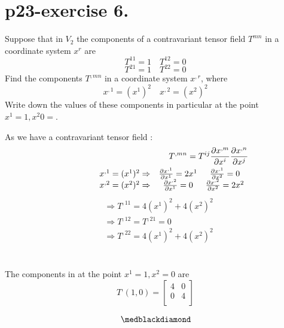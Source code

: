 \section{p23-exercise 6.}
\begin{tcolorbox}
Suppose that in $V_2$ the components of a contravariant tensor field $T^{mn}$ in a coordinate system $x^r$ are 
$$T^{11}=1 \quad T^{12}=0$$
$$T^{21}=1 \quad T^{22}=0$$
Find the components $T^{,mn}$ in a coordinate system $x^{,r}$, where
$$x^{,1} =(x^{1})^2\quad x^{,2} = (x^{2})^2$$
Write down the values of these components in particular at the point $x^1 = 1, x^2 0 =$.
\end{tcolorbox}
As we have a contravariant tensor field :
\begin{align}
\ T^{,mn} =  T^{ij}\pdv{x^{,m}}{x^{i}}\pdv{x^{,n}}{x^{j}}\\
 \begin{array}{ccc}
   \quad \quad \quad \quad  x^{,1} =(x^{1})^2  \Rightarrow & \pdv{x^{,1}}{x^{1}} = 2x^{1} & \pdv{x^{,1}}{x^{2}} = 0\\
\quad \quad \quad \quad x^{,2} =(x^{2})^2  \Rightarrow & \pdv{x^{,2}}{x^{1}} = 0 & \pdv{x^{,2}}{x^{2}} = 2x^{2}\\
  \end{array}\\
  \end{align}
  \begin{align}
  &\Rightarrow T^{,11} = 4(x^{1})^2 + 4(x^{2})^2 \\
  &\Rightarrow T^{,12} = T^{,21}=0 \\
  &\Rightarrow T^{,22} = 4(x^{1})^2 + 4(x^{2})^2
  \end{align}\\\\
  The components in  at the point $x^1 = 1, x^2 = 0$ are
  $$T^{,}(1,0) = \left[{\begin{array}{cc} 4 & 0 \\
    0 & 4 \\ 
    \end{array} } \right]$$
    
    $$\medblackdiamond$$
\pagebreak[4]